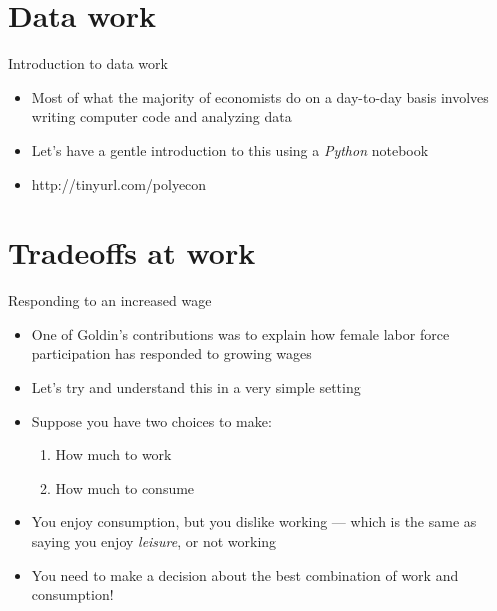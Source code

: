 \documentclass[aspectratio=169]{beamer}
\begin{document}
\section{Data work}

\begin{frame}{Introduction to data work}
    \begin{itemize}
        \item Most of what the majority of economists do on a day-to-day basis involves writing computer code and analyzing data
        \item Let's have a gentle introduction to this using a \textit{Python} notebook
        \item http://tinyurl.com/polyecon
    \end{itemize}
\end{frame}

\section{Tradeoffs at work}

\begin{frame}{Responding to an increased wage}
    \begin{itemize}
        \item One of Goldin's contributions was to explain how female labor force participation has responded to growing wages
        \item Let's try and understand this in a very simple setting
        \item Suppose you have two choices to make:
        \begin{enumerate}
            \item How much to work
            \item How much to consume
        \end{enumerate}
        \item You enjoy consumption, but you dislike working --- which is the same as saying you enjoy \textit{leisure}, or not working
        \item You need to make a decision about the best combination of work and consumption!
    \end{itemize}
\end{frame}
\end{document}
